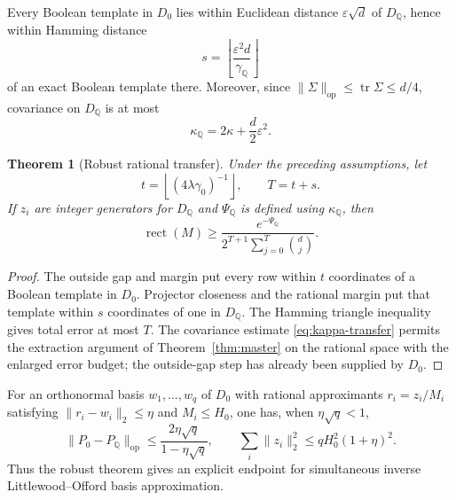 \documentclass[11pt]{article}
\newtheorem{theorem}{Theorem}[section]
\theoremstyle{definition}
\theoremstyle{remark}
\newcommand{\1}{\mathbf 1}
\newcommand{\rect}{\operatorname{rect}}
\begin{document}
Every Boolean template in $D_0$ lies within Euclidean distance
$\varepsilon\sqrt d$ of $D_\mathbb Q$, hence within Hamming distance
\begin{equation}\label{eq:rational-error}
 s=\left\lfloor\frac{\varepsilon^2d}{\gamma_\mathbb Q}\right\rfloor
\end{equation}
of an exact Boolean template there.  Moreover, since
$\|\Sigma\|_{\mathrm{op}}\le\operatorname{tr}\Sigma\le d/4$, covariance on
$D_\mathbb Q$ is at most
\begin{equation}\label{eq:kappa-transfer}
 \kappa_\mathbb Q=2\kappa+\frac d2\varepsilon^2.
\end{equation}

\begin{theorem}[Robust rational transfer]\label{thm:robust}
Under the preceding assumptions, let
\[
 t=\left\lfloor(4\lambda\gamma_0)^{-1}\right\rfloor,
 \qquad T=t+s.
\]
If $z_i$ are integer generators for $D_\mathbb Q$ and $\Psi_\mathbb Q$ is
defined using $\kappa_\mathbb Q$, then
\[
 \rect(M)\ge
 \frac{e^{-\Psi_\mathbb Q}}
 {2^{T+1}\sum_{j=0}^T\binom dj}.
\]
\end{theorem}

\begin{proof}
The outside gap and margin put every row within $t$ coordinates of a Boolean
template in $D_0$.  Projector closeness and the rational margin put that
template within $s$ coordinates of one in $D_\mathbb Q$.  The Hamming
triangle inequality gives total error at most $T$.  The covariance estimate
\eqref{eq:kappa-transfer} permits the extraction argument of
Theorem~\ref{thm:master} on the rational space with the enlarged error
budget; the outside-gap step has already been supplied by $D_0$.
\end{proof}

For an orthonormal basis $w_1,\ldots,w_q$ of $D_0$ with rational
approximants $r_i=z_i/M_i$ satisfying $\|r_i-w_i\|_2\le\eta$ and
$M_i\le H_0$, one has, when $\eta\sqrt q<1$,
\[
 \|P_0-P_\mathbb Q\|_{\mathrm{op}}
 \le\frac{2\eta\sqrt q}{1-\eta\sqrt q},
 \qquad
 \sum_i\|z_i\|_2^2\le qH_0^2(1+\eta)^2.
\]
Thus the robust theorem gives an explicit endpoint for simultaneous inverse
Littlewood--Offord basis approximation.



\end{document}
